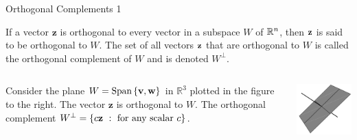 \documentclass[xcolor=dvipsnames,aspectratio=169,t]{beamer}
\begin{document}
\begin{frame}{Orthogonal Complements 1}
  \begin{definition}
    If a vector $\mathbf{z}$ is \alert{orthogonal to every vector in a subspace $W$} of $\mathbb{R}^n$, then $\mathbf{z}$ is said to be \alert{orthogonal to $W$}.
    The set of all vectors $\mathbf{z}$ that are orthogonal to $W$ is called the \alert{orthogonal complement of $W$} and is denoted \alert{$W^{\perp}$}.
  \end{definition}

  \begin{columns}[T]
  \column{0.8\tw}
  {\small Consider the plane $W = \mbox{Span} \left\{ \mathbf{v} , \mathbf{w} \right\}$ in $\mathbb{R}^3$ plotted in the figure to the right. }
  \bi
  \ii The vector $\mathbf{z}$ is orthogonal to $W$.
  \ii The orthogonal complement $W^{\perp} = \left\{ c \mathbf{z} \ : \ \mbox{for any scalar } c \right\}$.
  \ei

  \column{0.2\tw}
  \includegraphics[width=0.9\tw]{images/fig-orthog-comp1.png}
  \end{columns}

\end{frame}
\end{document}
